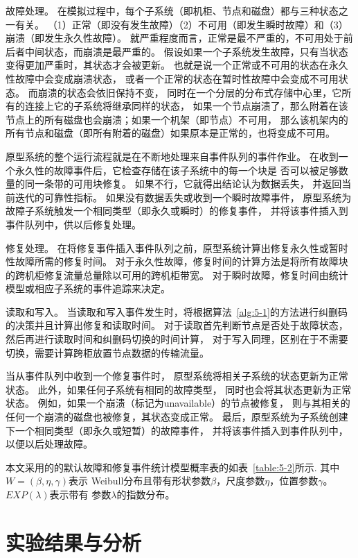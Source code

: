 故障处理。 在模拟过程中，每个子系统（即机柜、节点和磁盘）都与三种状态之一有关。 
（1）正常（即没有发生故障）（2）不可用（即发生瞬时故障）和（3）崩溃（即发生永久性故障）。 
就严重程度而言，正常是最不严重的，不可用处于前后者中间状态，而崩溃是最严重的。 
假设如果一个子系统发生故障，只有当状态变得更加严重时，其状态才会被更新。 
也就是说一个正常或不可用的状态在永久性故障中会变成崩溃状态，
或者一个正常的状态在暂时性故障中会变成不可用状态。 而崩溃的状态会依旧保持不变，
同时在一个分层的分布式存储中心里，它所有的连接上它的子系统将继承同样的状态，
如果一个节点崩溃了，那么附着在该节点上的所有磁盘也会崩溃；如果一个机架（即节点）不可用，
那么该机架内的所有节点和磁盘（即所有附着的磁盘）如果原本是正常的，也将变成不可用。 

原型系统的整个运行流程就是在不断地处理来自事件队列的事件作业。 
在收到一个永久性的故障事件后，它检查存储在该子系统中的每一个块是
否可以被足够数量的同一条带的可用块修复。 如果不行，它就得出结论认为数据丢失，
并返回当前迭代的可靠性指标。 如果没有数据丢失或收到一个瞬时故障事件，
原型系统为故障子系统触发一个相同类型（即永久或瞬时）的修复事件，
并将该事件插入到事件队列中，供以后修复处理。

修复处理。 在将修复事件插入事件队列之前，原型系统计算出修复永久性或暂时性故障所需的修复时间。 
对于永久性故障，修复时间的计算方法是将所有故障块的跨机柜修复流量总量除以可用的跨机柜带宽。 
对于瞬时故障，修复时间由统计模型或相应子系统的事件追踪来决定。

读取和写入。 当读取和写入事件发生时，将根据算法~\ref{alg:5-1}的方法进行纠删码的决策并且计算出修复和读取时间。 
对于读取首先判断节点是否处于故障状态，然后再进行读取时间和纠删码切换的时间计算，
对于写入同理，区别在于不需要切换，需要计算跨柜放置节点数据的传输流量。 

当从事件队列中收到一个修复事件时，
原型系统将相关子系统的状态更新为正常状态。 
此外，如果任何子系统有相同的故障类型，
同时也会将其状态更新为正常状态。 
例如，如果一个崩溃（标记为unavailable）的节点被修复，
则与其相关的任何一个崩溃的磁盘也被修复，其状态变成正常。 
最后，原型系统为子系统创建下一个相同类型（即永久或短暂）的故障事件，
并将该事件插入到事件队列中，以便以后处理故障。

本文采用的的默认故障和修复事件统计模型概率表的如表~\ref{table:5-2}所示. 其中$W=(\beta,\eta,\gamma)$表示
Weibull分布且带有形状参数$\beta$，尺度参数$\eta$，位置参数$\gamma$。$EXP(\lambda)$表示带有
参数$\lambda$的指数分布。






\section{实验结果与分析}
